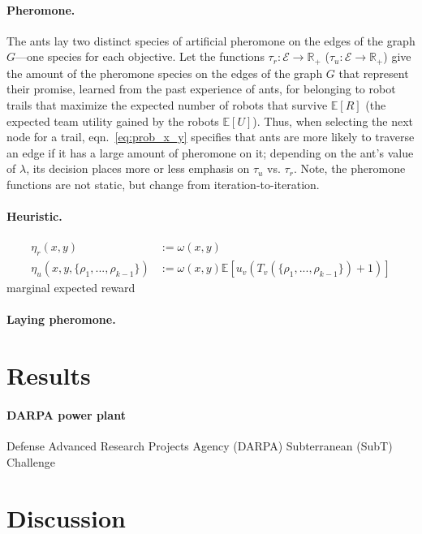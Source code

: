 \documentclass[11pt, oneside]{article}
\begin{document}
\paragraph{Pheromone.} The ants lay two distinct species of artificial pheromone on the edges of the graph $G$---one species for each objective. Let the functions $\tau_r:\mathcal{E}\rightarrow \mathbb{R}_+$ ($\tau_u:\mathcal{E}\rightarrow \mathbb{R}_+$) give the amount of the pheromone species on the edges of the graph $G$ that represent their promise, learned from the past experience of ants, for belonging to robot trails that maximize the expected number of robots that survive $\mathbb{E}[R]$ (the expected team utility gained by the robots $\mathbb{E}[U]$). Thus, when selecting the next node for a trail, eqn.~\ref{eq:prob_x_y} specifies that ants are more likely to traverse an edge if it has a large amount of pheromone on it; depending on the ant's value of $\lambda$, its decision places more or less emphasis on $\tau_u$ vs. $\tau_r$. Note, the pheromone functions are not static, but change from iteration-to-iteration. 


\paragraph{Heuristic.}

\begin{align}
\eta_r(x, y) & := \omega(x, y) \\
\eta_u(x, y, \{\rho_1, ..., \rho_{k-1}\}) & :=  \omega(x, y) \mathbb{E}[u_v(T_v(\{\rho_1, ..., \rho_{k-1}\})+1)]
\end{align}
marginal expected reward


\paragraph{Laying pheromone.}

\section{Results}

\paragraph{DARPA power plant}

Defense Advanced Research Projects Agency (DARPA) Subterranean (SubT) Challenge \cite{chung2023into}


\section{Discussion}
\end{document}

